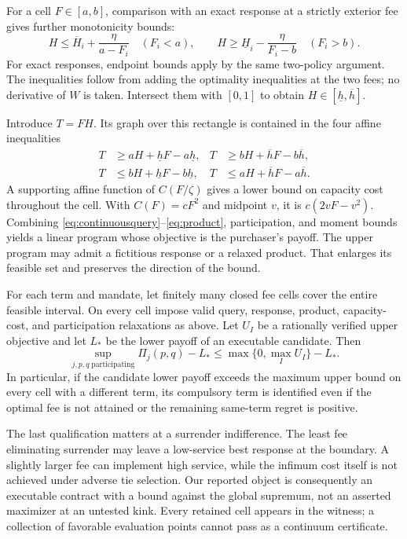 For a cell $F\in[a,b]$, comparison with an exact response at a strictly exterior fee gives further monotonicity bounds:
\begin{equation}
 H\leq\overline H_i+\frac{\eta}{a-F_i}\quad(F_i<a),\qquad
 H\geq\underline H_i-\frac{\eta}{F_i-b}\quad(F_i>b).
 \label{eq:feerange}
\end{equation}
For exact responses, endpoint bounds apply by the same two-policy argument. The inequalities follow from adding the optimality inequalities at the two fees; no derivative of $W$ is taken. Intersect them with $[0,1]$ to obtain $H\in[\underline h,\overline h]$.

Introduce $T=FH$. Its graph over this rectangle is contained in the four affine inequalities
\begin{align}
 T&\geq aH+\underline hF-a\underline h,&
 T&\geq bH+\overline hF-b\overline h,\nonumber\\
 T&\leq bH+\underline hF-b\underline h,&
 T&\leq aH+\overline hF-a\overline h.
 \label{eq:product}
\end{align}
A supporting affine function of $C(F/\zeta)$ gives a lower bound on capacity cost throughout the cell. With $C(F)=cF^2$ and midpoint $v$, it is $c(2vF-v^2)$. Combining \eqref{eq:continuousquery}--\eqref{eq:product}, participation, and moment bounds yields a linear program whose objective is the purchaser's payoff. The upper program may admit a fictitious response or a relaxed product. That enlarges its feasible set and preserves the direction of the bound.

\begin{theorem}
\label{thm:continuous}
For each term and mandate, let finitely many closed fee cells cover the entire feasible interval. On every cell impose valid query, response, product, capacity-cost, and participation relaxations as above. Let $U_I$ be a rationally verified upper objective and let $L_*$ be the lower payoff of an executable candidate. Then
\begin{equation}
 \sup_{j,p,q\;\mathrm{participating}}\Pi_j(p,q)-L_*
 \leq\max\{0,\max_I U_I\}-L_*.
 \label{eq:continuumregret}
\end{equation}
In particular, if the candidate lower payoff exceeds the maximum upper bound on every cell with a different term, its compulsory term is identified even if the optimal fee is not attained or the remaining same-term regret is positive.
\end{theorem}

The last qualification matters at a surrender indifference. The least fee eliminating surrender may leave a low-service best response at the boundary. A slightly larger fee can implement high service, while the infimum cost itself is not achieved under adverse tie selection. Our reported object is consequently an executable contract with a bound against the global supremum, not an asserted maximizer at an untested kink. Every retained cell appears in the witness; a collection of favorable evaluation points cannot pass as a continuum certificate.

